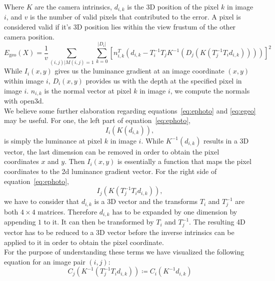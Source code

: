         Where $K$ are the camera intrinsics, $d_{i,k}$ is the 3D position of the pixel $k$ in image $i$, and $v$ is the number of valid pixels that contributed to the error.
        A pixel is considered valid if it's 3D position lies within the view frustum of the other camera position.
        \begin{equation}
            E_{\text{geo}}(X) =
            \frac{1}{v} \sum_{(i,j) | M(i,j)=1}\sum_{k=0}^{\left\lvert D_i \right\rvert}
            \left[
            n_{i,k}^T \left(d_{i,k} - T_i^{-1}T_jK^{-1} \left( D_j \left( K\left( T_j^{-1}T_id_{i,k} \right) \right) \right)\right)
            \right]^2
            \label{eq:egeo}
        \end{equation}
        While $I_i(x,y)$ gives us the luminance gradient at an image coordinate $(x,y)$ within image $i$, $D_i(x,y)$ provides us with the depth at the specified pixel in image $i$.
        $n_{i,k}$ is the normal vector at pixel $k$ in image $i$, we compute the normals with open3d.\\
        We believe some further elaboration regarding equations~\ref{eq:ephoto} and \ref{eq:egeo} may be useful.
        For one, the left part of equation~\ref{eq:ephoto},
        \begin{equation*}
            I_i(K(d_{i,k})),
        \end{equation*}
        is simply the luminance at pixel $k$ in image $i$.
        While $K^{-1}(d_{i,k})$ results in a 3D vector, the last dimension can be removed in order to obtain the pixel coordinates $x$ and $y$.
        Then $I_i(x,y)$ is essentially a function that maps the pixel coordinates to the 2d luminance gradient vector.
        For the right side of equation~\ref{eq:ephoto},
        \begin{equation*}
            I_j(K(T_j^{-1}T_id_{i,k})),
        \end{equation*}
        we have to consider that $d_{i,k}$ is a 3D vector and the transforms $T_i$ and $T_j^{-1}$ are both $4 \times 4$ matrices.
        Therefore $d_{i,k}$ has to be expanded by one dimension by appending $1$ to it.
        It can then be transformed by $T_i$ and $T_j^{-1}$.
        The resulting 4D vector has to be reduced to a 3D vector before the inverse intrinsics can be applied to it in order to obtain the pixel coordinate.\\
        For the purpose of understanding these terms we have visualized the following equation for an image pair $(i, j)$:
        \begin{equation}
            C_j(K^{-1}(T_j^{-1}T_id_{i,k})) \coloneqq C_i(K^{-1}d_{i,k})
            \label{eq:vis_perspective}
        \end{equation}
